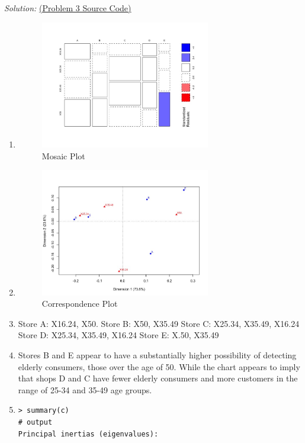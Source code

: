 \documentclass{article}
\newenvironment{solution}
    {\textit{Solution:}}
    {}
\begin{document}
\begin{solution}
\href{run:./src/p3.r}{ (Problem 3 Source Code)}
\begin{enumerate}
\item\mbox{}
	\begin{figure}[h]
		\centering
		\includegraphics[width=0.7\textwidth]{Figrue3_MosaicPlot.jpeg}
		\caption{Mosaic Plot}
	\end{figure}
\newpage 
\item\mbox{}
	\begin{figure}[h]
		\centering
		\includegraphics[width=0.7\textwidth]{Figure3_Correspondence.jpeg}
		\caption{Correspondence Plot}
	\end{figure}
\item
Store A: X16.24, X50.
\newline
Store B: X50, X35.49
\newline
Store C: X25.34, X35.49, X16.24
\newline
Store D: X25.34, X35.49, X16.24 
\newline
Store E: X.50, X35.49
\item
Stores B and E appear to have a substantially higher possibility of detecting elderly consumers, those over the age of 50. While the chart appears to imply that shops D and C have fewer elderly consumers and more customers in the range of 25-34 and 35-49 age groups.
\newpage
\item\mbox{}
	\begin{lstlisting}
> summary(c)
# output
Principal inertias (eigenvalues):


\end{lstlisting}
\end{enumerate}
\end{solution}
\end{document}
